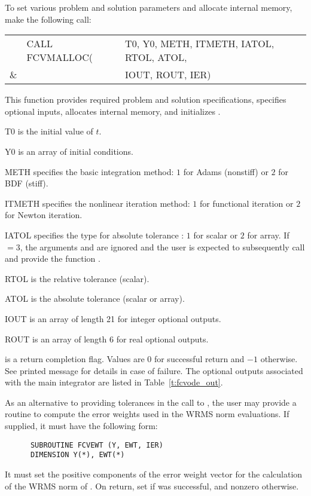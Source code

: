 \begin{Steps}
  To set various problem and solution parameters and allocate
  internal memory, make the following call:
  {
    \begin{tabular}[t]{@{}r@{}l@{}l}
        &CALL FCVMALLOC(&T0, Y0, METH, ITMETH, IATOL, RTOL, ATOL, \\
    {\&}&               &IOUT, ROUT, IER)
    \end{tabular}
  }
  {
    This function provides required problem and solution specifications, 
    specifies optional inputs,
    allocates internal memory, and initializes {\cvode}.
  }
  {
    \begin{args}[ITMETH]
    \item[T0] is the initial value of $t$.
    \item[Y0] is an array of initial conditions.
    \item[METH] specifies the  basic integration method: 
      $1$ for Adams (nonstiff) or $2$ for BDF (stiff).
    \item[ITMETH] specifies the nonlinear iteration method: 
      $1$ for functional iteration or $2$ for Newton iteration.
    \item[IATOL] specifies the type for absolute tolerance :
      $1$ for scalar or $2$ for array. If $=3$, the arguments
       and  are ignored and the user is expected to
      subsequently call  and provide the function .
    \item[RTOL] is the relative tolerance (scalar).
    \item[ATOL] is the absolute tolerance (scalar or array).
    \item[IOUT] is an array of length 21 for integer optional outputs.
    \item[ROUT] is an array of length 6 for real optional outputs.
    \end{args}
  }
  {
     is a return completion flag.  Values are $0$ for successful return
    and $-1$ otherwise. See printed message for details in case of failure.
  }
  {
    The optional outputs associated with the main {\cvode} integrator
    are listed in Table~\ref{t:fcvode_out}.
  }

  As an alternative to providing tolerances in the call to , the
  user may provide a routine to compute the error weights used in the WRMS norm
  evaluations. If supplied, it must have the following form:
\begin{verbatim}
      SUBROUTINE FCVEWT (Y, EWT, IER)
      DIMENSION Y(*), EWT(*)
\end{verbatim}
  It must set the positive components of the error weight vector  for
  the calculation of the WRMS norm of . On return, set
   if  was successful, and nonzero otherwise.


\end{Steps}
